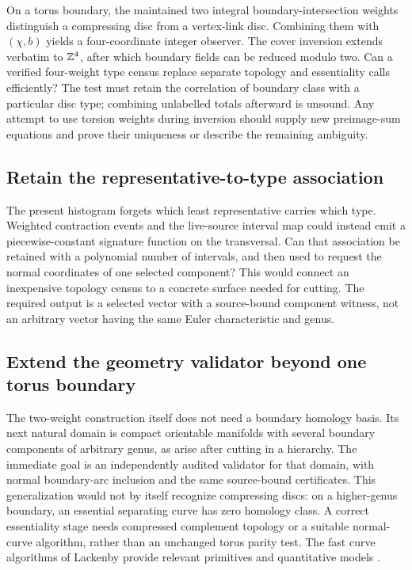 On a torus boundary, the maintained two integral boundary-intersection
weights distinguish a compressing disc from a vertex-link disc. Combining
them with $(\chi,b)$ yields a four-coordinate integer observer. The
cover inversion extends verbatim to $\mathbb Z^4$, after which boundary fields
can be reduced modulo two. Can a verified four-weight type census replace
separate topology and essentiality calls efficiently? The test must retain
the correlation of boundary class with a particular disc type; combining
unlabelled totals afterward is unsound. Any attempt to use torsion weights
during inversion should supply new preimage-sum equations and prove their
uniqueness or describe the remaining ambiguity.

\subsection{Retain the representative-to-type association}

The present histogram forgets which least representative carries which
type. Weighted contraction events and the live-source interval map could
instead emit a piecewise-constant signature function on the transversal.
Can that association be retained with a polynomial number of intervals,
and then used to request the normal coordinates of one selected component?
This would connect an inexpensive topology census to a concrete surface
needed for cutting. The required output is a selected vector with a
source-bound component witness, not an arbitrary vector having the same
Euler characteristic and genus.

\subsection{Extend the geometry validator beyond one torus boundary}

The two-weight construction itself does not need a boundary homology basis.
Its next natural domain is compact orientable manifolds with several
boundary components of arbitrary genus, as arise after cutting in a
hierarchy. The immediate goal is an independently audited validator for
that domain, with normal boundary-arc inclusion and the same source-bound
certificates. This generalization would not by itself recognize
compressing discs: on a higher-genus boundary, an essential separating
curve has zero homology class. A correct essentiality stage needs compressed
complement topology or a suitable normal-curve algorithm, rather than an
unchanged torus parity test. The fast curve algorithms of Lackenby provide
relevant primitives and quantitative models \cite{lackenby-curves}.

